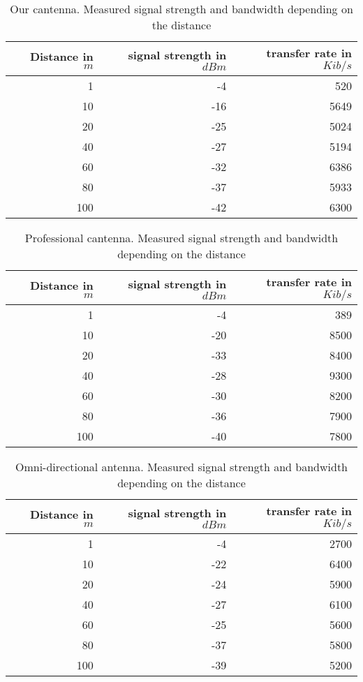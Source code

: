 
\begin{table}
	\begin{center}
		\begin{tabular}{r|r|r}\
		 Distance in $m$ & signal strength in $dBm$ & transfer rate in $Kib/s$\\
		 \hline 
		 1 & -4 & 520\\
		 10 & -16 & 5649\\
		 20 & -25 & 5024\\
		 40 & -27 & 5194\\
		 60 & -32 & 6386\\
		 80 & -37 & 5933\\
		 100 & -42 & 6300\\
		\end{tabular}
	\end{center}
	\caption{Our cantenna. Measured signal strength and bandwidth depending on the distance}
	\label{dist:can}
\end{table}

\begin{table}
	\begin{center}
		\begin{tabular}{r|r|r}\
			Distance in $m$ & signal strength in $dBm$ & transfer rate in $Kib/s$\\
			\hline 
			1 & -4 & 389\\
			10 & -20 & 8500\\
			20 & -33 & 8400\\
			40 & -28 & 9300\\
			60 & -30 & 8200\\
			80 & -36 & 7900\\
			100 & -40 & 7800\\
		\end{tabular}
	\end{center}
	\caption{Professional cantenna. Measured signal strength and bandwidth depending on the distance}
	\label{dist:prof}
\end{table}

\begin{table}
	\begin{center}
		\begin{tabular}{r|r|r}\
			Distance in $m$ & signal strength in $dBm$ & transfer rate in $Kib/s$\\
			\hline 
			1 & -4 & 2700\\
			10 & -22 & 6400\\
			20 & -24 & 5900\\
			40 & -27 & 6100\\
			60 & -25 & 5600\\
			80 & -37 & 5800\\
			100 & -39 & 5200\\
		\end{tabular}
	\end{center}
	\caption{Omni-directional antenna. Measured signal strength and bandwidth depending on the distance}
	\label{dist:omni}
\end{table}


